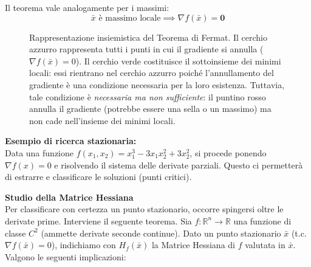 \documentclass[12pt, a4paper]{article}
\newcommand{\separatore}{\noindent{\color{titlecolor!50}\rule{\textwidth}{0.6pt}}}
\begin{document}
	Il teorema vale analogamente per i massimi: 
	\[ \bar{x} \text{ è massimo locale} \implies \nabla f(\bar{x}) = \mathbf{0} \]
	
	\begin{figure}[H]
		\centering
		\caption{Rappresentazione insiemistica del Teorema di Fermat. Il cerchio azzurro rappresenta tutti i punti in cui il gradiente si annulla ($\nabla f(\bar{x}) = 0$). Il cerchio verde costituisce il sottoinsieme dei minimi locali: essi rientrano nel cerchio azzurro poiché l'annullamento del gradiente è una condizione necessaria per la loro esistenza. Tuttavia, tale condizione è \textit{necessaria ma non sufficiente}: il puntino rosso annulla il gradiente (potrebbe essere una sella o un massimo) ma non cade nell'insieme dei minimi locali.}
	\end{figure}
	
	\vspace{0.4cm}
	\textbf{Esempio di ricerca stazionaria:}\\
	Data una funzione $f(x_1, x_2) = x_1^3 - 3x_1 x_2^2 + 3x_2^2$, si procede ponendo $\nabla f(x) = 0$ e risolvendo il sistema delle derivate parziali. Questo ci permetterà di estrarre e classificare le soluzioni (punti critici).
	
	\vspace{0.4cm}
	\separatore
	\vspace{0.4cm}
	
	\textbf{Studio della Matrice Hessiana}\\
	Per classificare con certezza un punto stazionario, occorre spingersi oltre le derivate prime. Interviene il seguente teorema.
	Sia $f : \mathbb{R}^n \to \mathbb{R}$ una funzione di classe $C^2$ (ammette derivate seconde continue). Dato un punto stazionario $\bar{x}$ (t.c. $\nabla f(\bar{x}) = 0$), indichiamo con $H_f(\bar{x})$ la Matrice Hessiana di $f$ valutata in $\bar{x}$. Valgono le seguenti implicazioni:
	
\end{document}
